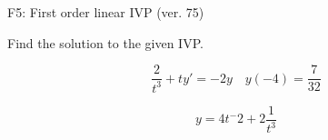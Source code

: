 \begin{exercise}
  \begin{exerciseTitle}F5: First order linear IVP (ver. 75)\end{exerciseTitle}
  \begin{exerciseStatement}
    
Find the solution to the given IVP.

    
\[\frac{2}{t^{3}} +ty'= -2 y \hspace{1em} y( -4 ) = \frac{7}{32}\]

  \end{exerciseStatement}
  \begin{exerciseAnswer}
    
\[y= 4 t^ -2 +2 \frac{1}{t^{3}}\]

  \end{exerciseAnswer}
\end{exercise}